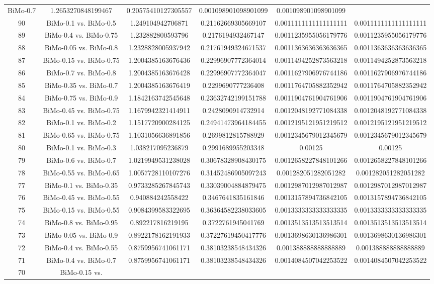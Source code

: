 \documentclass[a4paper,10pt]{article}
\begin{document}
\begin{landscape}
\begin{table}[!htp]
\begin{tabular}{cccccc}
BiMo-0.7&1.2653270848199467&0.20575410127305557&0.001098901098901099&0.001098901098901099\\90&BiMo-0.1 vs. BiMo-0.5&1.249104942706871&0.21162669305669107&0.0011111111111111111&0.0011111111111111111\\89&BiMo-0.4 vs. BiMo-0.75&1.232882800593796&0.2176194932467147&0.0011235955056179776&0.0011235955056179776\\88&BiMo-0.05 vs. BiMo-0.8&1.2328828005937942&0.21761949324671537&0.0011363636363636365&0.0011363636363636365\\87&BiMo-0.15 vs. BiMo-0.75&1.2004385163676436&0.22996907772364014&0.0011494252873563218&0.0011494252873563218\\86&BiMo-0.7 vs. BiMo-0.8&1.2004385163676428&0.22996907772364047&0.0011627906976744186&0.0011627906976744186\\85&BiMo-0.35 vs. BiMo-0.7&1.2004385163676419&0.2299690777236408&0.0011764705882352942&0.0011764705882352942\\84&BiMo-0.75 vs. BiMo-0.9&1.1842163742545648&0.23632742199151788&0.0011904761904761906&0.0011904761904761906\\83&BiMo-0.45 vs. BiMo-0.75&1.1679942321414911&0.2428090914732914&0.0012048192771084338&0.0012048192771084338\\82&BiMo-0.1 vs. BiMo-0.2&1.1517720900284125&0.24941473964184455&0.0012195121951219512&0.0012195121951219512\\81&BiMo-0.65 vs. BiMo-0.75&1.1031056636891856&0.2699812815788929&0.0012345679012345679&0.0012345679012345679\\80&BiMo-0.1 vs. BiMo-0.3&1.038217095236879&0.2991689955203348&0.00125&0.00125\\79&BiMo-0.6 vs. BiMo-0.7&1.0219949531238028&0.30678328908430175&0.0012658227848101266&0.0012658227848101266\\78&BiMo-0.55 vs. BiMo-0.65&1.0057728110107276&0.31452486905097243&0.001282051282051282&0.001282051282051282\\77&BiMo-0.1 vs. BiMo-0.35&0.9733285267845743&0.33039004884879475&0.0012987012987012987&0.0012987012987012987\\76&BiMo-0.45 vs. BiMo-0.55&0.940884242558422&0.3467641835161846&0.0013157894736842105&0.0013157894736842105\\75&BiMo-0.15 vs. BiMo-0.55&0.9084399583322695&0.36364582238033605&0.0013333333333333335&0.0013333333333333335\\74&BiMo-0.8 vs. BiMo-0.95&0.892217816219195&0.3722761945041769&0.0013513513513513514&0.0013513513513513514\\73&BiMo-0.05 vs. BiMo-0.9&0.8922178162191933&0.37227619450417776&0.0013698630136986301&0.0013698630136986301\\72&BiMo-0.4 vs. BiMo-0.55&0.8759956741061171&0.38103238548434326&0.001388888888888889&0.001388888888888889\\71&BiMo-0.4 vs. BiMo-0.7&0.8759956741061171&0.38103238548434326&0.0014084507042253522&0.0014084507042253522\\70&BiMo-0.15 vs. 
\end{tabular}
\end{table}
\end{landscape}
\end{document}
